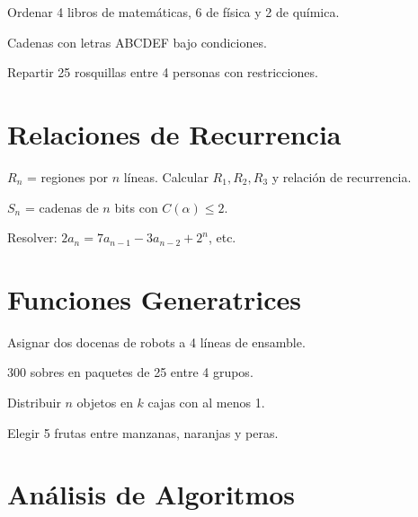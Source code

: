 \begin{ejercicio}
Ordenar 4 libros de matemáticas, 6 de física y 2 de química.
\end{ejercicio}

\begin{ejercicio}
Cadenas con letras ABCDEF bajo condiciones.
\end{ejercicio}

\begin{ejercicio}
Repartir 25 rosquillas entre 4 personas con restricciones.
\end{ejercicio}

\section{Relaciones de Recurrencia}

\begin{ejercicio}
$R_n$ = regiones por $n$ líneas. Calcular $R_1, R_2, R_3$ y relación de recurrencia.
\end{ejercicio}

\begin{ejercicio}
$S_n$ = cadenas de $n$ bits con $C(\alpha) \leq 2$.
\end{ejercicio}

\begin{ejercicio}
Resolver: $2a_n = 7a_{n-1} - 3a_{n-2} + 2^n$, etc.
\end{ejercicio}

\section{Funciones Generatrices}

\begin{ejercicio}
Asignar dos docenas de robots a 4 líneas de ensamble.
\end{ejercicio}

\begin{ejercicio}
300 sobres en paquetes de 25 entre 4 grupos.
\end{ejercicio}

\begin{ejercicio}
Distribuir $n$ objetos en $k$ cajas con al menos 1.
\end{ejercicio}

\begin{ejercicio}
Elegir 5 frutas entre manzanas, naranjas y peras.
\end{ejercicio}

\section{Análisis de Algoritmos}

